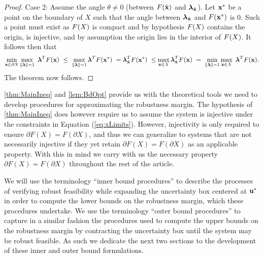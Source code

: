 \begin{thm}
\begin{proof}
    Case 2: Assume the angle $\theta \neq 0$ (between $F(\hat{\mathbf{x}})$ and $\boldsymbol{\lambda}_{\hat{\mathbf{x}}}$). 
    Let $\mathbf{x}^*$ be a point on the boundary of $X$ such that the angle between $\boldsymbol{\lambda}_{\hat{\mathbf{x}}}$ and $F(\mathbf{x}^*)$ is 0. 
    Such a point must exist as $F(X)$ is compact and by hypothesis $F(X)$ contains the origin, is injective,
    and by assumption the origin lies in the interior of $F(X)$. 
    It follows then that
    \[
      \min\limits_{\vx\in \partial X}\max\limits_{\norm{\vlambda}=1}\ \vlambda^T\vF(\vx) ~\leq~
      \max\limits_{\norm{\vlambda}=1}\vlambda^T \vF(\vx^*) ~=
      \vlambda_{\hat{\vx}}^T\vF(\vx^*) ~\leq
      \max\limits_{\vx\in X}\vlambda_{\hat{\vx}}^T\vF(\vx) ~=~
      \min\limits_{\norm{\vlambda}=1}\max\limits_{\vx\in X}\ \vlambda^T\vF(\vx).
    \]
    The theorem now follows.
  \end{proof}
\end{thm}

\cref{thm:MainIneq} and \cref{lem:BdOpt} provide us with the theoretical tools we need to develop procedures for approximating the robustness margin.
The hypothesis of \cref{thm:MainIneq} does however require us to assume the system is injective under the constraints in Equation (\ref{eq:xLimits}).
However, injectivity is only required to ensure $\partial F(X) = F(\partial X)$, and thus we can generalize to systems that are not necessarily injective if they yet retain $\partial F(X) = F(\partial X)$ as an applicable property. 
With this in mind we carry with us the necessary property $\partial F(X) = F(\partial X)$ throughout the rest of the article. 

We will use the terminology \enquote{inner bound procedures} to describe the processes of verifying robust feasibility while expanding the uncertainty box centered at $\mathbf{u}^*$ in order to compute the lower bounds on the robustness margin, which these procedures undertake. 
We use the terminology \enquote{outer bound procedures} to capture in a similar fashion the procedures used to compute the upper bounds on the robustness margin by contracting the uncertainty box until the system may be robust feasible. 
As such we dedicate the next two sections to the development of these inner and outer bound formulations. 
